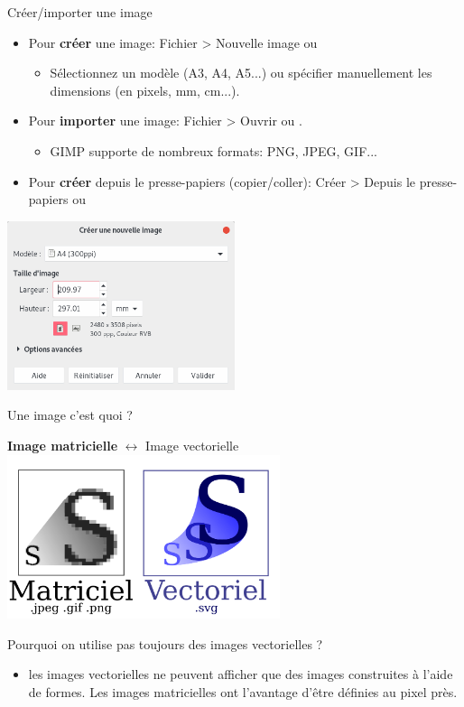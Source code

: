 \documentclass[10pt,svgnames,usenames,table]{beamer}
\begin{document}
\begin{frame}{Créer/importer une image}
	\begin{itemize}
		\item Pour \textbf{créer} une image: Fichier > Nouvelle image ou 
			\begin{itemize}
				\item Sélectionnez un modèle (A3, A4, A5...) ou spécifier manuellement les dimensions (en pixels, mm, cm...).
			\end{itemize}
		\item Pour \textbf{importer} une image: Fichier  > Ouvrir ou .
			\begin{itemize}
				\item GIMP supporte de nombreux formats: PNG, JPEG, GIF...
			\end{itemize}
		\item Pour \textbf{créer} depuis le presse-papiers (copier/coller): Créer > Depuis le presse-papiers ou 
	\end{itemize}
	\begin{center}
		\includegraphics[width=0.5\textwidth]{Images/new_image.png}
	\end{center}
\end{frame}

\begin{frame}{Une image c'est quoi ?}
	\begin{center} 
		\textbf{Image matricielle} $\leftrightarrow$ Image vectorielle 
		\includegraphics[width=0.6\textwidth]{Images/mat_vs_vec.png}
	\end{center}
	Pourquoi on utilise pas toujours des images vectorielles ? 
	\begin{itemize}
		\item les images vectorielles ne peuvent afficher que des images construites à l'aide de formes. Les images matricielles ont l'avantage d'être définies au pixel près.
	\end{itemize}
\end{frame}
\end{document}
